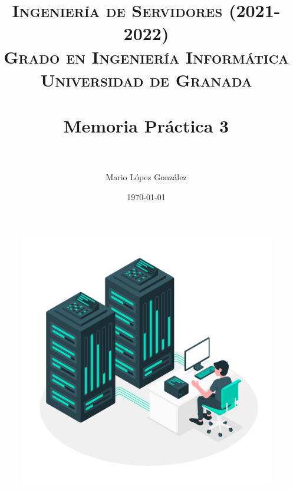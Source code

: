 

\title{	
\normalfont \normalsize 
\textsc{\textbf{Ingeniería de Servidores (2021-2022)} \\ Grado en Ingeniería Informática \\ Universidad de Granada} \\ [25pt] %
\horrule{0.5pt} \\[0.4cm] %
\huge Memoria Práctica 3 \\ %
\horrule{2pt} \\[0.5cm] %
}

\author{Mario López González} %

\date{\normalsize\today} %




\maketitle %

\begin{figure}[H]
    \centering
    \includegraphics[scale=0.175]{images/server.jpg}
    \label{fig:server}
\end{figure}

